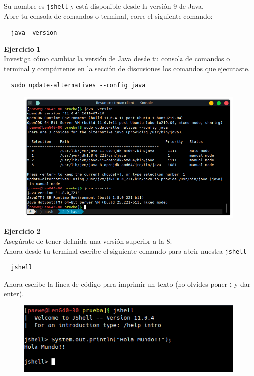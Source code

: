 \documentclass{article}
\begin{document}
Su nombre es \texttt{jshell} y está disponible desde la versión 9 de Java.\\

Abre tu consola de comandos o terminal, corre el siguiente comando:

\begin{verbatim}
  java -version
\end{verbatim}

\textbf{Ejercicio 1}\\
Investiga cómo cambiar la versión de Java desde tu consola de comandos o
terminal y compártenos en la sección de discusiones los comandos que
ejecutaste.\\

\begin{verbatim}
  sudo update-alternatives --config java
\end{verbatim}

\begin{figure}[h!]
  \centering
  \includegraphics[scale=0.75]{./Pictures/037_update_alternatives.png}
\end{figure}


\textbf{Ejercicio 2}\\
Asegúrate de tener definida una versión superior a la 8.\\
Ahora desde tu terminal escribe el siguiente comando para abrir nuestra \texttt{jshell}

\begin{verbatim}
  jshell
\end{verbatim}

Ahora escribe la línea de código para imprimir un texto (no olvides poner
\textbf{;} y dar enter).

\begin{figure}[h!]
  \centering
  \includegraphics[scale=0.75]{./Pictures/036_jshell.png}
\end{figure}
\end{document}
